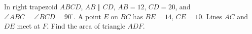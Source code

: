 In right trapezoid $ABCD$, $AB\parallel CD$, $AB=12$, $CD=20$, and $\angle ABC=\angle BCD=90^\circ$. A point $E$ on $BC$ has $BE=14$, $CE=10$. Lines $AC$ and $DE$ meet at $F$. Find the area of triangle $ADF$.
